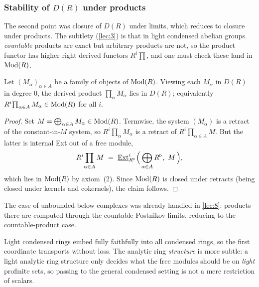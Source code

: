 \subsubsection*{Stability of $D(R)$ under products}

The second point was closure of $D(R)$ under limits, which reduces to closure
under products. The subtlety (\cref{lec:3}) is that in light condensed abelian
groups \emph{countable} products are exact but arbitrary products are not, so
the product functor has higher right derived functors $R^{i}\!\prod$, and one
must check these land in $\operatorname{Mod}(R)$.

\begin{proposition}
\label{prop:9:products}
Let $(M_{\alpha})_{\alpha\in A}$ be a family of objects of $\operatorname{Mod}(R)$. Viewing
each $M_{\alpha}$ in $D(R)$ in degree $0$, the derived product
$\prod_{\alpha}M_{\alpha}$ lies in $D(R)$; equivalently
$R^{i}\!\prod_{\alpha\in A}M_{\alpha}\in\operatorname{Mod}(R)$ for all $i$.
\end{proposition}

\begin{proof}
Set $M=\bigoplus_{\alpha\in A}M_{\alpha}\in\operatorname{Mod}(R)$. Termwise, the system
$(M_{\alpha})$ is a retract of the constant-in-$M$ system, so
$R^{i}\!\prod_{\alpha}M_{\alpha}$ is a retract of $R^{i}\!\prod_{\alpha\in A}M$.
But the latter is internal Ext out of a free module,
\begin{equation*}
R^{i}\!\prod_{\alpha\in A}M\ =\ \underline{\operatorname{Ext}}^{i}_{R^{\triangleright}}\Bigl(\,\bigoplus_{\alpha\in A}
R^{\triangleright},\ M\,\Bigr),
\end{equation*}
which lies in $\operatorname{Mod}(R)$ by axiom~(2). Since $\operatorname{Mod}(R)$ is closed under retracts
(being closed under kernels and cokernels), the claim follows.
\end{proof}

The case of unbounded-below complexes was already handled in \cref{lec:8}:
products there are computed through the countable Postnikov limits, reducing to
the countable-product case.

\begin{remark}
\label{rmk:9:light-vs-general}
Light condensed rings embed fully faithfully into all condensed rings, so the
first coordinate transports without loss. The analytic ring \emph{structure} is
more subtle: a light analytic ring structure only decides what the free modules
should be on \emph{light} profinite sets, so passing to the general condensed
setting is not a mere restriction of scalars.
\end{remark}

